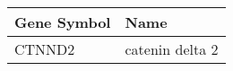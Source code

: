\begin{tabular}{ll}
\toprule
Gene Symbol &            Name \\
\midrule
     CTNND2 & catenin delta 2 \\
\bottomrule
\end{tabular}
